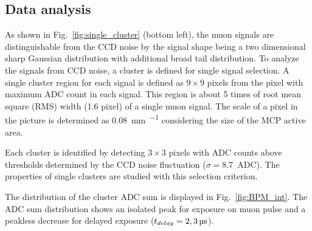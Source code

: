 \documentclass[preprint,3p,twocolumn]{elsarticle}
\begin{document}
\subsection{Data analysis}

As shown in Fig.~\ref{fig:single_cluster} (bottom left), the muon signals are distinguishable from the CCD noise by the signal shape being a two dimensional sharp Gaussian distribution with additional broad tail distribution. 
To analyze the signals from CCD noise, a cluster is defined for single signal selection. A single cluster region for each signal is defined as $9 \times 9$ pixels from the pixel with maximum ADC count in each signal. This region is about 5 times of root mean square (RMS) width (1.6 pixel) of a single muon signal. The scale of a pixel in the picture is determined as \SI{0.08}{\mm \per \pixel} considering the size of the MCP active area.

Each cluster is identified by detecting $3 \times 3$ pixels with ADC counts above thresholds determined by the CCD noise fluctuation ($\sigma=$\SI{8.7}{ADC}). The properties of single clusters are studied with this selection criterion.

The distribution of the cluster ADC sum is displayed in Fig.~\ref{fig:BPM_int}.
The ADC sum distribution shows an isolated peak for exposure on muon pulse and a peakless decrease for delayed exposure ($t_{delay} = \SIlist[list-pair-separator = {, }, list-units = single]{2; 3}{\micro\s}$).
\end{document}

